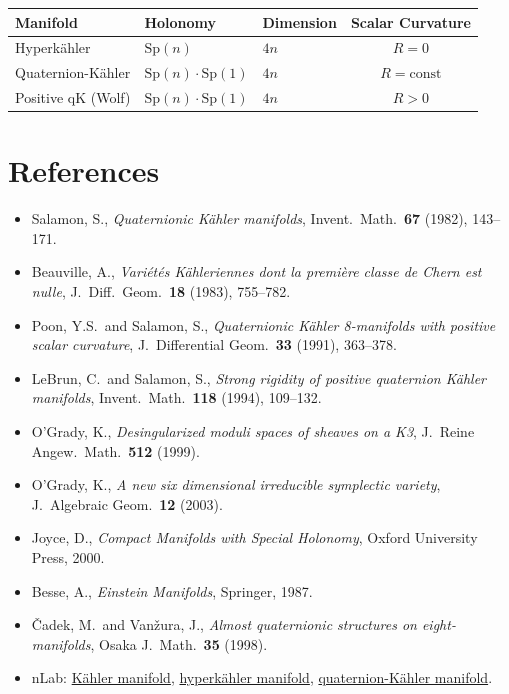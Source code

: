 \documentclass[12pt]{article}
\theoremstyle{definition}
\theoremstyle{plain}
\newcommand{\Sp}{\mathrm{Sp}}
\begin{document}
\begin{center}
\renewcommand{\arraystretch}{1.5}
\begin{tabular}{lllc}
\toprule
\textbf{Manifold} & \textbf{Holonomy} & \textbf{Dimension} & \textbf{Scalar Curvature} \\
\midrule
Hyperk\"{a}hler & $\Sp(n)$ & $4n$ & $R = 0$ \\
Quaternion-K\"{a}hler & $\Sp(n)\cdot\Sp(1)$ & $4n$ & $R = \mathrm{const}$ \\
Positive qK (Wolf) & $\Sp(n)\cdot\Sp(1)$ & $4n$ & $R > 0$ \\
\bottomrule
\end{tabular}
\end{center}

\section*{References}

\begin{itemize}
  \item Salamon, S., \textit{Quaternionic K\"{a}hler manifolds}, Invent.\ Math.\ \textbf{67} (1982), 143--171.
  \item Beauville, A., \textit{Vari\'{e}t\'{e}s K\"{a}hleriennes dont la premi\`{e}re classe de Chern est nulle}, J.\ Diff.\ Geom.\ \textbf{18} (1983), 755--782.
  \item Poon, Y.S.\ and Salamon, S., \textit{Quaternionic K\"{a}hler 8-manifolds with positive scalar curvature}, J.\ Differential Geom.\ \textbf{33} (1991), 363--378.
  \item LeBrun, C.\ and Salamon, S., \textit{Strong rigidity of positive quaternion K\"{a}hler manifolds}, Invent.\ Math.\ \textbf{118} (1994), 109--132.
  \item O'Grady, K., \textit{Desingularized moduli spaces of sheaves on a K3}, J.\ Reine Angew.\ Math.\ \textbf{512} (1999).
  \item O'Grady, K., \textit{A new six dimensional irreducible symplectic variety}, J.\ Algebraic Geom.\ \textbf{12} (2003).
  \item Joyce, D., \textit{Compact Manifolds with Special Holonomy}, Oxford University Press, 2000.
  \item Besse, A., \textit{Einstein Manifolds}, Springer, 1987.
  \item \v{C}adek, M.\ and Van\v{z}ura, J., \textit{Almost quaternionic structures on eight-manifolds}, Osaka J.\ Math.\ \textbf{35} (1998).
  \item nLab: \href{https://ncatlab.org/nlab/show/Kähler+manifold}{K\"{a}hler manifold}, \href{https://ncatlab.org/nlab/show/hyperkähler+manifold}{hyperk\"{a}hler manifold}, \href{https://ncatlab.org/nlab/show/quaternion-Kähler+manifold}{quaternion-K\"{a}hler manifold}.
\end{itemize}
\end{document}
